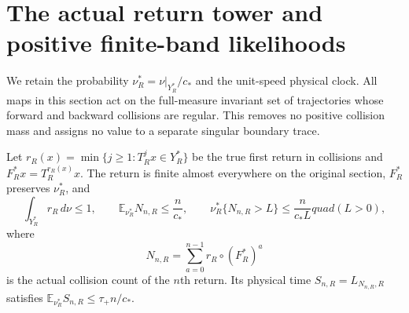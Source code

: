 \section{The actual return tower and positive finite-band likelihoods}
\label{sec:av-return-likelihood}

We retain the probability $\nu_R^*=\nu|_{Y_R^*}/c_*$ and the
unit-speed physical clock.  All maps in this section act on the
full-measure invariant set of trajectories whose forward and backward
collisions are regular.  This removes no positive collision mass and
assigns no value to a separate singular boundary trace.

\begin{lemma}
\label{lem:av-tower}
Let $r_R(x)=\min\{j\ge1:T_R^jx\in Y_R^*\}$ be the true first
return in collisions and $F_R^*x=T_R^{r_R(x)}x$.  The return is finite
almost everywhere on the original section, $F_R^*$ preserves
$\nu_R^*$, and
\begin{equation}\label{eq:av-tower-moment}
 \int_{Y_R^*}r_R\,d\nu\le1,\qquad
 \mathbb E_{\nu_R^*}N_{n,R}\le\frac{n}{c_*},\qquad
 \nu_R^*\{N_{n,R}>L\}\le\frac{n}{c_*L}quad(L>0),
\end{equation}
where
\[
 N_{n,R}=\sum_{a=0}^{n-1}r_R\circ(F_R^*)^a
\]
is the actual collision count of the $n$th return.  Its physical time
$S_{n,R}=L_{N_{n,R},R}$ satisfies
$\mathbb E_{\nu_R^*}S_{n,R}\le\tau_+n/c_*$.
\end{lemma}
